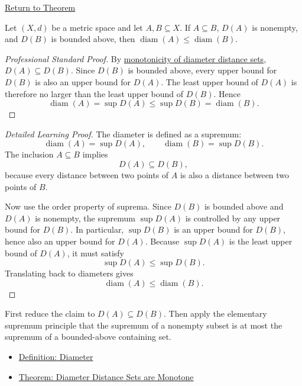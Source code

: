 \newpage
{}
\label{prf:metric-diameter-monotone-under-inclusion}

\begin{remark*}[Return]
\hyperref[thm:metric-diameter-monotone-under-inclusion]{Return to Theorem}
\end{remark*}

\begin{theorem*}
Let \((X,d)\) be a metric space and let \(A,B\subseteq X\).  If
\(A\subseteq B\), \(D(A)\) is nonempty, and \(D(B)\) is bounded above, then
\(\operatorname{diam}(A)\leq\operatorname{diam}(B)\).
\end{theorem*}

\begin{proof}[Professional Standard Proof]
\LRAProofBodyStart
By \hyperref[thm:metric-diameter-set-monotone]{monotonicity of diameter
distance sets}, \(D(A)\subseteq D(B)\).  Since \(D(B)\) is bounded above,
every upper bound for \(D(B)\) is also an upper bound for \(D(A)\).  The least
upper bound of \(D(A)\) is therefore no larger than the least upper bound of
\(D(B)\).  Hence
\[
  \operatorname{diam}(A)=\sup D(A)\leq \sup D(B)=\operatorname{diam}(B).
\]
\end{proof}

\begin{proof}[Detailed Learning Proof]
\LRAProofBodyStart
The diameter is defined as a supremum:
\[
  \operatorname{diam}(A)=\sup D(A),
  \qquad
  \operatorname{diam}(B)=\sup D(B).
\]
The inclusion \(A\subseteq B\) implies
\[
  D(A)\subseteq D(B),
\]
because every distance between two points of \(A\) is also a distance between
two points of \(B\).

Now use the order property of suprema.  Since \(D(B)\) is bounded above and
\(D(A)\) is nonempty, the supremum \(\sup D(A)\) is controlled by any upper
bound for \(D(B)\).  In particular, \(\sup D(B)\) is an upper bound for
\(D(B)\), hence also an upper bound for \(D(A)\).  Because \(\sup D(A)\) is
the least upper bound of \(D(A)\), it must satisfy
\[
  \sup D(A)\leq \sup D(B).
\]
Translating back to diameters gives
\[
  \operatorname{diam}(A)\leq \operatorname{diam}(B).
\]
\end{proof}

\begin{remark*}
First reduce the claim to \(D(A)\subseteq D(B)\).  Then apply the elementary
supremum principle that the supremum of a nonempty subset is at most the
supremum of a bounded-above containing set.
\end{remark*}

\begin{dependencies}
\begin{itemize}
  \item \hyperref[def:metric-diameter]{Definition: Diameter}
  \item \hyperref[thm:metric-diameter-set-monotone]{Theorem: Diameter Distance Sets are Monotone}
\end{itemize}
\end{dependencies}

\clearpage
